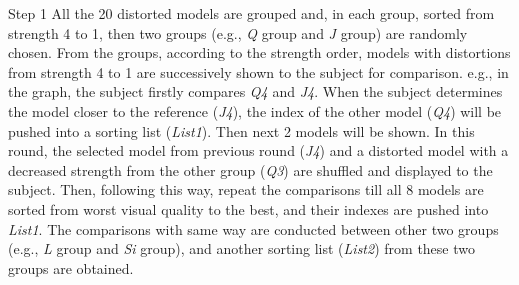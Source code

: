 Step 1  All the 20 distorted models are grouped and, in each group, sorted from strength 4 to 1, then two groups (e.g., \textit{Q} group and \textit{J} group) are randomly chosen. From the groups, according to the strength order, models with distortions from strength 4 to 1 are successively shown to the subject for comparison. e.g., in the graph, the subject firstly compares \textit{Q4} and \textit{J4}.  When the subject determines the model closer to the reference (\textit{J4}), the index of the other model (\textit{Q4}) will be pushed into a sorting list (\textit{List1}). Then next 2 models will be shown. In this round, the selected model from previous round (\textit{J4}) and a distorted model with a decreased strength from the other group (\textit{Q3}) are shuffled and displayed to the subject. Then, following this way, repeat the comparisons till all 8 models are sorted from worst visual quality to the best, and their indexes are pushed into \textit{List1}. The comparisons with same way are conducted between other two groups (e.g., \textit{L} group and \textit{Si} group), and another sorting list (\textit{List2}) from these two groups are obtained. 